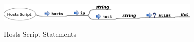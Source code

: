 \begin{figure}[htp]
\centering
\includegraphics[width=0.9\textwidth]{hosts_service_script}
\label{fig:hosts_script_statements}
\caption{Hosts Script Statements}
\end{figure}

